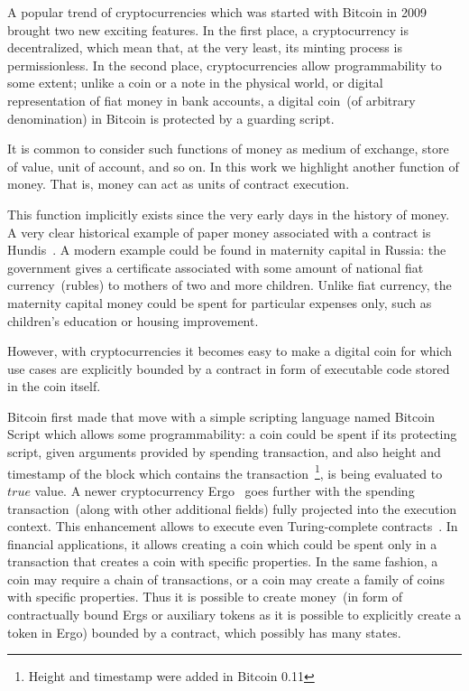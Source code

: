 \documentclass[]{llncs}   %
\begin{document}
A popular trend of cryptocurrencies which was started with Bitcoin in 2009 brought two new exciting features.
In the first place, a cryptocurrency is decentralized, which mean that, at the very least, its minting process is permissionless.
In the second place, cryptocurrencies allow programmability to some extent; unlike a coin or a note in the physical
world, or digital representation of fiat money in bank accounts, a digital coin~(of arbitrary denomination) in Bitcoin
is protected by a guarding script.

It is common to consider such functions of money as medium of exchange, store of value, unit of account, and so on.
In this work we highlight another function of money. That is, money can act as units of contract execution.

This function implicitly exists since the very early days in the history of money. A very clear historical example of paper money associated with a contract is Hundis~\cite{martin2009hundi}. A modern example could be found in
maternity capital in Russia: the government gives a certificate associated with some amount of national fiat currency~(rubles)
to mothers of two and more children. Unlike fiat currency, the maternity capital money could be spent for particular
expenses only, such as children's education or housing improvement.

However, with cryptocurrencies it becomes easy to make a digital coin for which use cases are
explicitly bounded by a contract in form of executable code stored in the coin itself.

Bitcoin first made that move with a simple
scripting language named Bitcoin Script which allows some programmability: a coin could be spent if its protecting script,
given arguments provided by spending transaction, and also height and timestamp of the block which contains the
transaction~\footnote{Height and timestamp were added in Bitcoin 0.11},
is being evaluated to $true$ value. A newer cryptocurrency Ergo~\cite{ergowp} goes further with the spending transaction~(along with other additional
fields) fully projected into the execution context. This enhancement allows to execute even Turing-complete
contracts~\cite{chepurnoy2018self}. In financial applications, it allows creating a coin which could be spent only in
a transaction that creates a coin with specific properties. In the same fashion, a coin may require a chain of
transactions, or a coin may create a family of coins with specific properties. Thus it is possible to create money~(in
form of contractually bound Ergs or auxiliary tokens as it is possible to explicitly create a token in Ergo) bounded by a contract, which possibly has many states. 
\end{document}

